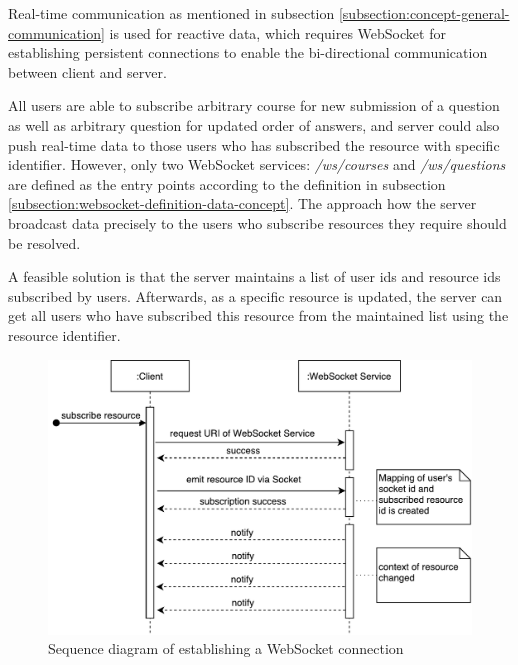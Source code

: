 
Real-time communication as mentioned in subsection \ref{subsection:concept-general-communication} is used for reactive data, which requires WebSocket for establishing persistent connections to enable the bi-directional communication between client and server.


All users are able to subscribe arbitrary course for new submission of a question as well as arbitrary question for updated order of answers, and server could also push real-time data to those users who has subscribed the resource with specific identifier. However, only two WebSocket services: \textit{/ws/courses} and \textit{/ws/questions} are defined as the entry points according to the definition in subsection \ref{subsection:websocket-definition-data-concept}. The approach how the server broadcast data precisely to the users who subscribe resources they require should be resolved.

A feasible solution is that the server maintains a list of user ids and resource ids subscribed by users. Afterwards, as a specific resource is updated, the server can get all users who have subscribed this resource from the maintained list using the resource identifier.

\begin{figure}[!htbp]
  \centering
    \includegraphics[width=1\textwidth]{Figures/concept-websocket-connection-sequence.pdf}
  \caption{Sequence diagram of establishing a WebSocket connection}
  \label{fig:websocket-connection-sequence-concept}
\end{figure}

